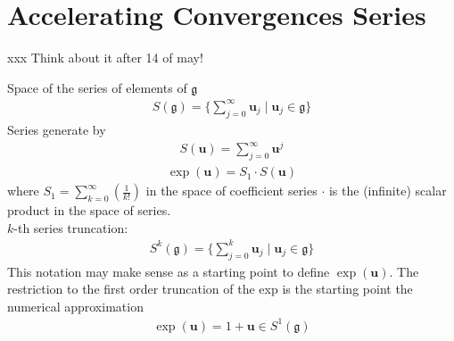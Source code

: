
\chapter{Accelerating Convergences Series}\label{ch:accelerating}

xxx Think about it after 14 of may!

Space of the series of elements of $\mathfrak{g}$
\begin{align*}
S(\mathfrak{g}) = \{ \sum_{j=0}^{\infty} \mathbf{u}_{j} \mid \mathbf{u}_{j} \in \mathfrak{g}  \}
\end{align*}
Series generate by 
\begin{align*}
S(\mathbf{u}) =\sum_{j=0}^{\infty} \mathbf{u}^{j} 
\end{align*}
\begin{align*}
\exp(\mathbf{u}) = S_1  \cdot S(\mathbf{u}) 
\end{align*}
where $S_1 = \sum_{k=0}^{\infty} (\frac{1}{k!})$ in the space of coefficient series $\cdot $ is the (infinite) scalar product in the space of series.\\
$k$-th series truncation:
\begin{align*}
S^{k}(\mathfrak{g})  = \{ \sum_{j=0}^{k} \mathbf{u}_{j} \mid \mathbf{u}_{j} \in \mathfrak{g}  \}
\end{align*}
This notation may make sense as a starting point to define $\exp(\mathbf{u})$. 
The restriction to the first order truncation of the exp is the starting point the numerical approximation
\begin{align*}
\exp(\mathbf{u}) = 1 + \mathbf{u} \in S^{1}(\mathfrak{g}) 
\end{align*}